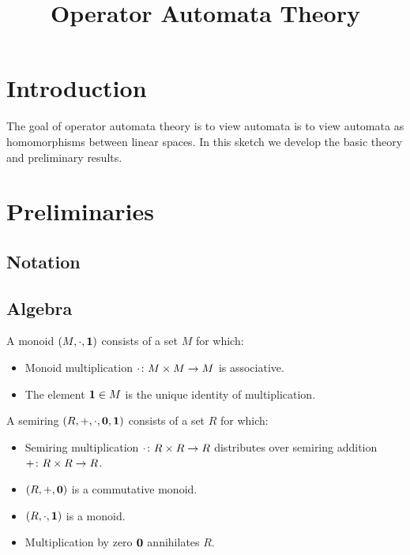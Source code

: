 \documentclass[12pt]{article}
\title{Operator Automata Theory}
\date{}
\begin{document}
\maketitle

\section{Introduction}

The goal of operator automata theory is to view automata is to
view automata as homomorphisms between linear spaces.
In this sketch we develop the basic theory and preliminary results.


\section{Preliminaries}

\subsection{Notation}


\subsection{Algebra}

\begin{definition}[Monoid]
  A monoid \(\left(M, \cdot, \mathbf{1}\right)\) consists of a set \(M\) for which:
  \begin{itemize}
    \item
      Monoid multiplication
      \(\cdot \colon M \times M \to M\) is associative.

    \item
      The element \(\mathbf{1} \in M\) is the unique identity of multiplication.
  \end{itemize}
\end{definition}

\begin{definition}[Semiring]
  A semiring \(\left(R, +, \cdot, \mathbf{0}, \mathbf{1}\right)\) consists of a set \(R\)
  for which:
  \begin{itemize}
    \item
      Semiring multiplication \(\cdot \colon R \times R \to R\)
      distributes over semiring addition \(+ \colon R \times R \to R\).

    \item
      \(\left(R, +, \mathbf{0}\right)\) is a commutative monoid.

    \item
      \(\left(R, \cdot, \mathbf{1}\right)\) is a monoid.

    \item
      Multiplication by zero \(\mathbf{0}\) annihilates \(R\).
  \end{itemize}
\end{definition}
\end{document}
